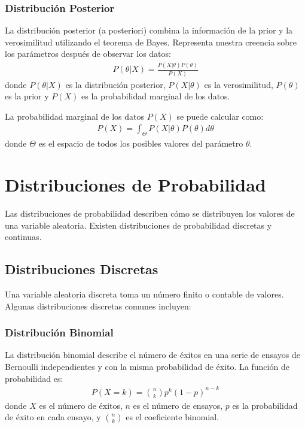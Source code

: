 \documentclass[a4paper]{report} %
\begin{document}
\subsubsection{Distribuci\'on Posterior}

La distribuci\'on posterior (a posteriori) combina la informaci\'on de la prior y la verosimilitud utilizando el teorema de Bayes. Representa nuestra creencia sobre los par\'ametros despu\'es de observar los datos:
\begin{eqnarray*}
P(\theta|X) = \frac{P(X|\theta)P(\theta)}{P(X)}
\end{eqnarray*}
donde $P(\theta|X)$ es la distribuci\'on posterior, $P(X|\theta)$ es la verosimilitud, $P(\theta)$ es la prior y $P(X)$ es la probabilidad marginal de los datos.

La probabilidad marginal de los datos $P(X)$ se puede calcular como:
\begin{eqnarray*}
P(X) = \int_{\Theta} P(X|\theta)P(\theta) d\theta
\end{eqnarray*}
donde $\Theta$ es el espacio de todos los posibles valores del par\'ametro $\theta$.

\section{Distribuciones de Probabilidad}

Las distribuciones de probabilidad describen c\'omo se distribuyen los valores de una variable aleatoria. Existen distribuciones de probabilidad discretas y continuas.

\subsection{Distribuciones Discretas}

Una variable aleatoria discreta toma un n\'umero finito o contable de valores. Algunas distribuciones discretas comunes incluyen:

\subsubsection{Distribuci\'on Binomial}

La distribuci\'on binomial describe el n\'umero de \'exitos en una serie de ensayos de Bernoulli independientes y con la misma probabilidad de \'exito. La funci\'on de probabilidad es:
\begin{eqnarray*}
P(X = k) = \binom{n}{k} p^k (1-p)^{n-k}
\end{eqnarray*}
donde $X$ es el n\'umero de \'exitos, $n$ es el n\'umero de ensayos, $p$ es la probabilidad de \'exito en cada ensayo, y $\binom{n}{k}$ es el coeficiente binomial.
\end{document}
